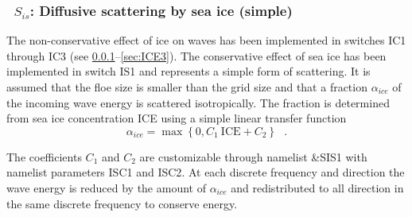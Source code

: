 \vsssub
\subsubsection{~$S_{is}$: Diffusive scattering by sea ice (simple)} \label{sec:ICE1}
\vsssub


\noindent
The non-conservative effect of ice on waves has been implemented in switches
{\code IC1} through {\code IC3} (see \para\ref{sec:ICE1}--\ref{sec:ICE3}). The
conservative effect of sea ice has been implemented in switch {\code IS1} and
represents a simple form of scattering. It is assumed that the floe size is
smaller than the grid size and that a fraction $\alpha_{ice}$ of the incoming
wave energy is scattered isotropically. The fraction is determined from sea ice
concentration ICE using a simple linear transfer function
\begin{equation}\label{eq:IS101}
     \alpha_{ice} = \max\left \{0 , C_1\ \mathrm{ICE} + C_2 \right \} \:\:\: .
\end{equation}

\noindent
The coefficients $C_1$ and $C_2$ are customizable through namelist {\code \&SIS1}
with namelist parameters {\code ISC1} and {\code ISC2}. At each discrete
frequency and direction the wave energy is reduced by the amount of
$\alpha_{ice}$ and redistributed to all direction in the same discrete
frequency to conserve energy.


